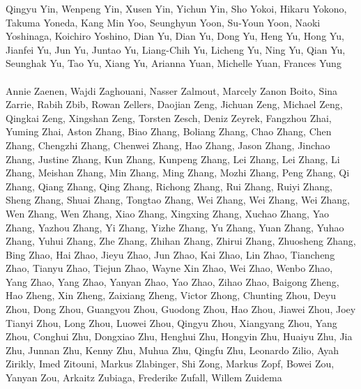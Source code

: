 \documentclass[11pt]{article}
\begin{document}
\begin{description}[itemsep=4mm, style=nextline]
Qingyu Yin, 
Wenpeng Yin, 
Xusen Yin, 
Yichun Yin, 
Sho Yokoi, 
Hikaru Yokono, 
Takuma Yoneda, 
Kang Min Yoo, 
Seunghyun Yoon, 
Su-Youn Yoon, 
Naoki Yoshinaga, 
Koichiro Yoshino, 
Dian Yu, 
Dian Yu, 
Dong Yu, 
Heng Yu, 
Hong Yu, 
Jianfei Yu, 
Jun Yu, 
Juntao Yu, 
Liang-Chih Yu, 
Licheng Yu, 
Ning Yu, 
Qian Yu, 
Seunghak Yu, 
Tao Yu, 
Xiang Yu, 
Arianna Yuan, 
Michelle Yuan, 
Frances Yung
\\
\\
Annie Zaenen, 
Wajdi Zaghouani, 
Nasser Zalmout, 
Marcely Zanon Boito, 
Sina Zarrie, 
Rabih Zbib, 
Rowan Zellers, 
Daojian Zeng, 
Jichuan Zeng, 
Michael Zeng, 
Qingkai Zeng, 
Xingshan Zeng, 
Torsten Zesch, 
Deniz Zeyrek, 
Fangzhou Zhai, 
Yuming Zhai, 
Aston Zhang, 
Biao Zhang, 
Boliang Zhang, 
Chao Zhang, 
Chen Zhang, 
Chengzhi Zhang, 
Chenwei Zhang, 
Hao Zhang, 
Jason Zhang, 
Jinchao Zhang, 
Justine Zhang, 
Kun Zhang, 
Kunpeng Zhang, 
Lei Zhang, 
Lei Zhang, 
Li Zhang, 
Meishan Zhang, 
Min Zhang, 
Ming Zhang, 
Mozhi Zhang, 
Peng Zhang, 
Qi Zhang, 
Qiang Zhang, 
Qing Zhang, 
Richong Zhang, 
Rui Zhang, 
Ruiyi Zhang, 
Sheng Zhang, 
Shuai Zhang, 
Tongtao Zhang, 
Wei Zhang, 
Wei Zhang, 
Wei Zhang, 
Wen Zhang, 
Wen Zhang, 
Xiao Zhang, 
Xingxing Zhang, 
Xuchao Zhang, 
Yao Zhang, 
Yazhou Zhang, 
Yi Zhang, 
Yizhe Zhang, 
Yu Zhang, 
Yuan Zhang, 
Yuhao Zhang, 
Yuhui Zhang, 
Zhe Zhang, 
Zhihan Zhang, 
Zhirui Zhang, 
Zhuosheng Zhang, 
Bing Zhao, 
Hai Zhao, 
Jieyu Zhao, 
Jun Zhao, 
Kai Zhao, 
Lin Zhao, 
Tiancheng Zhao, 
Tianyu Zhao, 
Tiejun Zhao, 
Wayne Xin Zhao, 
Wei Zhao, 
Wenbo Zhao, 
Yang Zhao, 
Yang Zhao, 
Yanyan Zhao, 
Yao Zhao, 
Zihao Zhao, 
Baigong Zheng, 
Hao Zheng, 
Xin Zheng, 
Zaixiang Zheng, 
Victor Zhong, 
Chunting Zhou, 
Deyu Zhou, 
Dong Zhou, 
Guangyou Zhou, 
Guodong Zhou, 
Hao Zhou, 
Jiawei Zhou, 
Joey Tianyi Zhou, 
Long Zhou, 
Luowei Zhou, 
Qingyu Zhou, 
Xiangyang Zhou, 
Yang Zhou, 
Conghui Zhu, 
Dongxiao Zhu, 
Henghui Zhu, 
Hongyin Zhu, 
Huaiyu Zhu, 
Jia Zhu, 
Junnan Zhu, 
Kenny Zhu, 
Muhua Zhu, 
Qingfu Zhu, 
Leonardo Zilio, 
Ayah Zirikly, 
Imed Zitouni, 
Markus Zlabinger, 
Shi Zong, 
Markus Zopf, 
Bowei Zou, 
Yanyan Zou, 
Arkaitz Zubiaga, 
Frederike Zufall, 
Willem Zuidema



\end{description}
\end{document}
